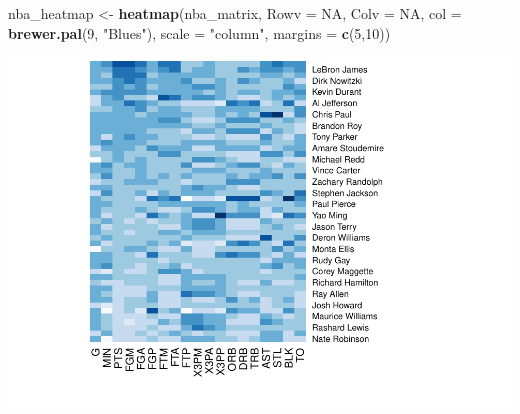 \documentclass[]{article}
\newenvironment{Shaded}{\begin{snugshade}}{\end{snugshade}}
\newcommand{\DataTypeTok}[1]{\textcolor[rgb]{0.13,0.29,0.53}{#1}}
\newcommand{\DecValTok}[1]{\textcolor[rgb]{0.00,0.00,0.81}{#1}}
\newcommand{\KeywordTok}[1]{\textcolor[rgb]{0.13,0.29,0.53}{\textbf{#1}}}
\newcommand{\NormalTok}[1]{#1}
\newcommand{\OtherTok}[1]{\textcolor[rgb]{0.56,0.35,0.01}{#1}}
\newcommand{\StringTok}[1]{\textcolor[rgb]{0.31,0.60,0.02}{#1}}
\begin{document}
\begin{Shaded}
\begin{Highlighting}[]
\NormalTok{nba_heatmap <-}\StringTok{ }\KeywordTok{heatmap}\NormalTok{(nba_matrix, }\DataTypeTok{Rowv =} \OtherTok{NA}\NormalTok{, }
                       \DataTypeTok{Colv =} \OtherTok{NA}\NormalTok{, }
                       \DataTypeTok{col =} \KeywordTok{brewer.pal}\NormalTok{(}\DecValTok{9}\NormalTok{, }\StringTok{"Blues"}\NormalTok{),}
                       \DataTypeTok{scale =} \StringTok{"column"}\NormalTok{,}
                       \DataTypeTok{margins =} \KeywordTok{c}\NormalTok{(}\DecValTok{5}\NormalTok{,}\DecValTok{10}\NormalTok{))}
\end{Highlighting}
\end{Shaded}

\includegraphics{Day_5_files/figure-latex/unnamed-chunk-34-3.pdf}
\end{document}
